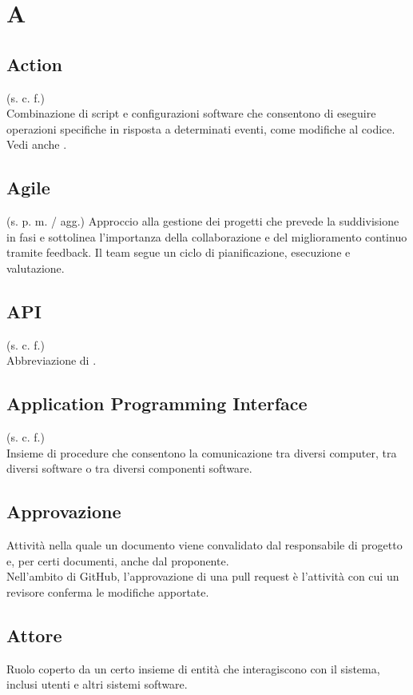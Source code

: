 \section{A}
    \subsection{Action}
    (s. c. f.)\\
    Combinazione di script e configurazioni software che consentono di eseguire operazioni 
    specifiche in risposta a determinati eventi, come modifiche al codice.
    Vedi anche .
    \subsection{Agile}
    (s. p. m. / agg.)
    Approccio alla gestione dei progetti che prevede la suddivisione in fasi e sottolinea 
    l'importanza della collaborazione e del miglioramento continuo tramite feedback. 
    Il team segue un ciclo di pianificazione, esecuzione e valutazione.
    \subsection{API}
    (s. c. f.)\\
    Abbreviazione di .
    \subsection{Application Programming Interface}
    \label{Application Programming Interface}
    (s. c. f.)\\
    Insieme di procedure che consentono la comunicazione tra diversi computer, tra diversi 
    software o tra diversi componenti software.
    \subsection{Approvazione}
    Attività nella quale un documento viene convalidato dal responsabile di progetto e, 
    per certi documenti, anche dal proponente. \\
    Nell'ambito di GitHub, l'approvazione di una pull request è l'attività con cui un 
    revisore conferma le modifiche apportate.
    \subsection{Attore}
    Ruolo coperto da un certo insieme di entità che interagiscono con il sistema, 
    inclusi utenti e altri sistemi software.
\pagebreak
